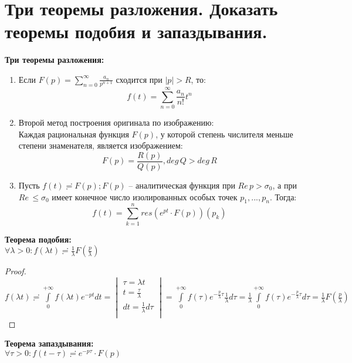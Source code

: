 \newpage
\section{Три теоремы разложения. Доказать теоремы подобия и запаздывания.}

\textbf{Три теоремы разложения:}
\begin{enumerate}
    \item Если $F(p) = \sum_{n=0}^\infty\frac{a_n}{p^{n+1}}$ сходится при $|p|>R$, то:
    $$f(t)=\sum_{n=0}^\infty\frac{a_n}{n!}t^n$$
    \item Второй метод построения оригинала по изображению:\\
    Каждая рациональная функция $F(p)$, у которой степень числителя меньше степени знаменателя, является изображением:
    $$F(p)=\frac{R(p)}{Q(p)}, deg\,Q>deg\,R$$
    \item Пусть $f(t)\risingdotseq F(p); F(p)$ -- аналитическая функция при $Re\,p>\sigma_0$, а при $Re\,\leq \sigma_0$ имеет конечное число изолированных особых точек $p_1, ..., p_n$. Тогда:
    $$f(t)=\sum_{k=1}^{n}res(e^{pt}\cdot F(p))(p_k)$$
\end{enumerate}

\textbf{Теорема подобия:}\\
$\forall \lambda > 0: f(\lambda t) \risingdotseq \frac{1}{\lambda} F\left(\frac{p}{\lambda}\right)$

\begin{proof}
    \ \\
    $f(\lambda t)\risingdotseq \int\limits_{0}^{+\infty}f(\lambda t)e^{-pt}dt =
    \begin{vmatrix}
        \tau=\lambda t\\
        t=\frac{\tau}{\lambda}\\
        dt=\frac{1}{\lambda}d\tau\\
    \end{vmatrix}
    = \int\limits_0^{+\infty} f(\tau)e^{-\frac{p}{\lambda}\tau}\frac{1}{\lambda}d\tau = \frac{1}{\lambda}\int\limits_0^{+\infty}f(\tau)e^{-\frac{p}{\lambda}\tau}d\tau=\frac{1}{\lambda} F\left(\frac{p}{\lambda}\right)$
\end{proof}

\textbf{Теорема запаздывания:}\\
$\forall \tau > 0: f(t-\tau) \risingdotseq e^{-p\tau}\cdot F(p)$
    
